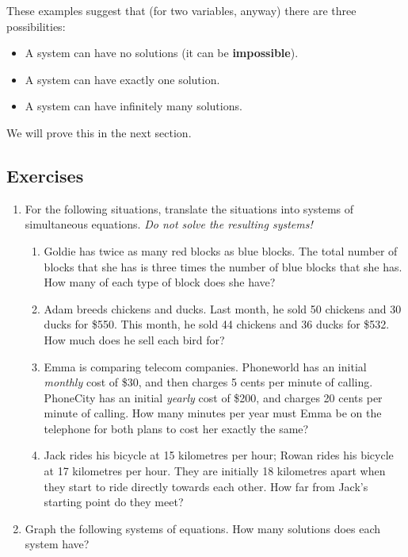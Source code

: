 \documentclass[a4paper,leqno]{article}
\numberwithin{equation}{section}
\theoremstyle{definition}
\theoremstyle{remark}
\newcommand{\df}[1]{\textbf{#1}}
\begin{document}
These examples suggest that (for two variables, anyway) there are three possibilities:
\begin{itemize}
  \item A system can have no solutions (it can be \df{impossible}).
  \item A system can have exactly one solution.
  \item A system can have infinitely many solutions.
\end{itemize}
We will prove this in the next section.

\subsection*{Exercises}
\begin{enumerate}
  \item For the following situations, translate the situations into systems of simultaneous equations. \emph{Do not solve the resulting
        systems!}
    \begin{enumerate}
      \item Goldie has twice as many red blocks as blue blocks. The total number of blocks that she has is three times the number of
            blue blocks that she has. How many of each type of block does she have?
      \item Adam breeds chickens and ducks. Last month, he sold 50 chickens and 30 ducks for \$550. This month, he sold 44 chickens
            and 36 ducks for \$532. How much does he sell each bird for?
      \item Emma is comparing telecom companies. Phoneworld has an initial \emph{monthly} cost of \$30, and then charges 5 cents per minute
            of calling. PhoneCity has an initial \emph{yearly} cost of \$200, and charges 20 cents per minute of calling. How many minutes
            per year must Emma be on the telephone for both plans to cost her exactly the same?
      \item Jack rides his bicycle at 15 kilometres per hour; Rowan rides his bicycle at 17 kilometres per hour. They are initially 18
            kilometres apart when they start to ride directly towards each other. How far from Jack's starting point do they meet?
    \end{enumerate}
  \item Graph the following systems of equations. How many solutions does each system have?
    \begin{center}
      \hspace*{\fill}\begin{enumerate*}

\end{enumerate*}
\end{center}
\end{enumerate}
\end{document}

